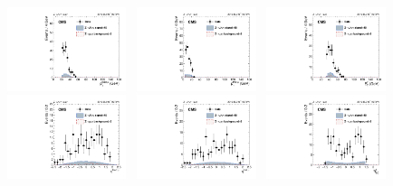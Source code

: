 		\begin{figure}[h]
		  \centering
		  \includegraphics[width=0.31\textwidth]{Fig/Final_NoPreliminary/ZJpsiG/leadingMuonPt_EBLR9}~
		  \includegraphics[width=0.31\textwidth]{Fig/Final_NoPreliminary/ZJpsiG/trailingMuonPt_EBLR9}~
		  \includegraphics[width=0.31\textwidth]{Fig/Final_NoPreliminary/ZJpsiG/phoPt_EBLR9}\\
		  \includegraphics[width=0.31\textwidth]{Fig/Final_NoPreliminary/ZJpsiG/leadingMuonEta_EBLR9}~
		  \includegraphics[width=0.31\textwidth]{Fig/Final_NoPreliminary/ZJpsiG/trailingMuonEta_EBLR9}~
		  \includegraphics[width=0.31\textwidth]{Fig/Final_NoPreliminary/ZJpsiG/phoSCEta_EBLR9}\\

\end{figure}
